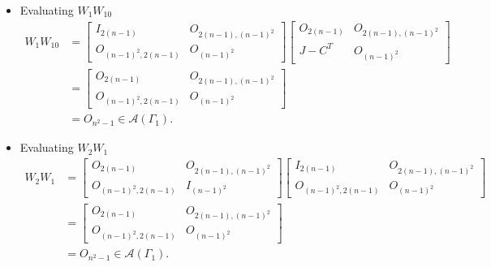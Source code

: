 \begin{itemize}
    \item Evaluating $W_1W_{10}$
    \begin{align*}
        W_1W_{10}
        &= \begin{bmatrix}
            I_{2(n-1)} & O_{2(n-1), (n-1)^2} \\
            O_{(n-1)^2, 2(n-1)} & O_{(n-1)^2}
        \end{bmatrix}\begin{bmatrix}
            O_{2(n-1)} & O_{2(n-1), (n-1)^2} \\
            J-C^T & O_{(n-1)^2}
        \end{bmatrix}\\
        &= \begin{bmatrix}
            O_{2(n-1)} & O_{2(n-1), (n-1)^2} \\
            O_{(n-1)^2, 2(n-1)} & O_{(n-1)^2}
        \end{bmatrix}\\
        &= O_{n^2-1} \in \mathcal{A}(\Gamma_1).
    \end{align*}
    
    \item Evaluating $W_2W_1$
    \begin{align*}
        W_2W_1
        &= \begin{bmatrix}
            O_{2(n-1)} & O_{2(n-1), (n-1)^2} \\
            O_{(n-1)^2, 2(n-1)} & I_{(n-1)^2}
        \end{bmatrix}\begin{bmatrix}
            I_{2(n-1)} & O_{2(n-1), (n-1)^2} \\
            O_{(n-1)^2, 2(n-1)} & O_{(n-1)^2}
        \end{bmatrix} \\
        &= \begin{bmatrix}
            O_{2(n-1)} & O_{2(n-1), (n-1)^2} \\
            O_{(n-1)^2, 2(n-1)} & O_{(n-1)^2}
        \end{bmatrix} \\
        &= O_{n^2-1}\in\mathcal{A}(\Gamma_1).
    \end{align*}
    

\end{itemize}
